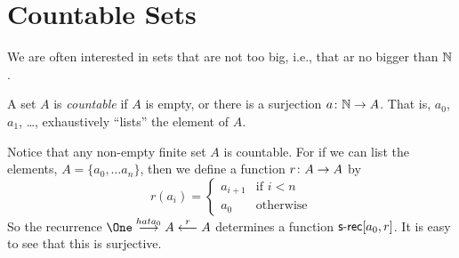 %		
%		
%		

\section{Countable Sets}

We are often interested in sets that are not too big, i.e., that ar no bigger than $\mathbb N$. 

\begin{defn}
A set $A$ is \emph{countable} if $A$ is empty, or there is a surjection ${a}\colon{\mathbb N}\to{A}$. 
That is, $a_0$, $a_1$, \ldots, exhaustively ``lists'' the element of $A$.
\end{defn}

Notice that any non-empty finite set $A$ is countable. For if we can list the elements,
$A = \{a_0,\ldots a_n\}$, then we define a function ${r}\colon{A}\to{A}$ by
\[r(a_i) = \begin{cases}
a_{i+1} & \text{if $i<n$}\\
a_0     &\text{otherwise}
\end{cases}\]
So the recurrence $\One\stackrel{hat{a_0}}{\longrightarrow}A\stackrel{r}{\longleftarrow}A$ determines a function $\mathord{\textsf{s-rec}}[a_0,r]$. It is easy to see that this is surjective.


